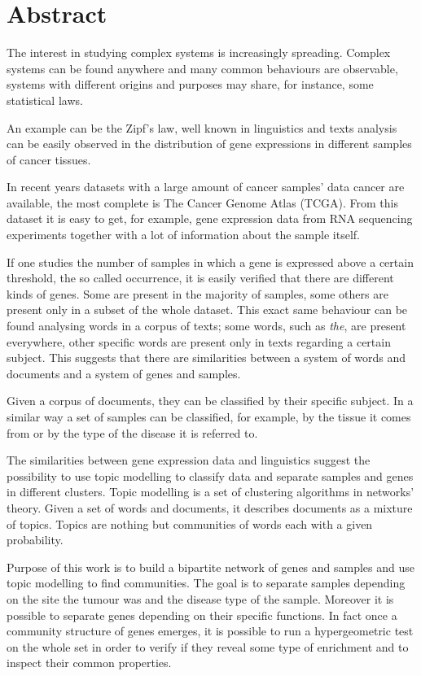 \chapter*{Abstract}
The interest in studying complex systems is increasingly spreading.
Complex systems can be found anywhere and many common behaviours are observable, systems with different origins and purposes 
may share, for instance, some statistical laws.

An example can be the Zipf's law, well known in linguistics and texts analysis 
can be easily observed in the distribution of gene expressions in different samples of cancer tissues.

In recent years datasets with a large amount of cancer samples' data cancer are available, the most complete is The Cancer Genome Atlas (TCGA).
From this dataset it is easy to get, for example, gene expression data from RNA sequencing experiments 
together with a lot of information about the sample itself.

If one studies the number of samples in which a gene is expressed above a certain threshold, 
the so called occurrence, it is easily verified that there are different kinds of 
genes. Some are present in the majority of samples, some others are present only 
in a subset of the whole dataset. This exact same behaviour can be found analysing words in a corpus of texts; some words, such as \textit{the},
are present everywhere, other specific words are present only in texts regarding a certain subject.
This suggests that there are similarities between a system of words and documents and a system of genes and samples.

Given a corpus of documents, they can be classified by their specific subject. In a similar way a set of samples can be 
classified, for example, by the tissue it comes from or by the type of the disease it is 
referred to.

The similarities between gene expression data and linguistics suggest the possibility to use topic modelling to classify 
data and separate samples and genes in different clusters. Topic modelling is a set of clustering algorithms in networks' theory. 
Given a set of words and documents, it describes documents as a mixture of topics. 
Topics are nothing but communities of words each with a given probability. 

Purpose of this work is to build a bipartite network of genes and samples and use topic modelling to find 
communities. The goal is to separate samples depending on the site the tumour was 
and the disease type of the sample. Moreover it is possible to separate genes depending on their specific functions. 
In fact once a community structure of genes emerges, 
it is possible to run a hypergeometric test on the whole set in order to verify 
if they reveal some type of enrichment and to inspect their common properties.

